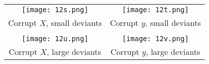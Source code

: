 \begin{figure}[H]
  \centering
  \begin{tabular}{cc}
    \texttt{[image: 12s.png]} & \hspace{1cm}
    \texttt{[image: 12t.png]} \\
    Corrupt $X$, small deviants & \hspace{1cm}
     Corrupt $y$, small deviants \\
    & \\
    \texttt{[image: 12u.png]} & \hspace{1cm}
    \texttt{[image: 12v.png]} \\
    Corrupt $X$, large deviants & \hspace{1cm}
    Corrupt $y$, large deviants \\
  \end{tabular}
\end{figure}